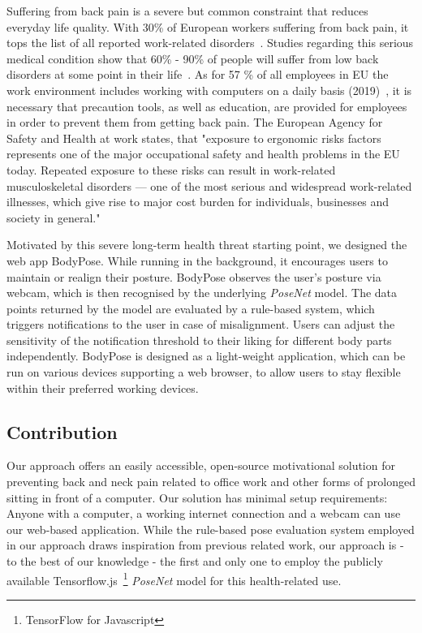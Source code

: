 Suffering from back pain is a severe but common constraint that reduces everyday life quality. With 30\% of European workers suffering from back pain, it tops the list of all reported work-related disorders~\cite{osha2000facts}. Studies regarding this serious medical condition show that 60\% - 90\% of people will suffer from low back disorders at some point in their life~\cite{osha2000facts}. As for 57 \% of all employees in EU the work environment includes working with computers on a daily basis (2019)~\cite{eurostat_comp_use}, it is necessary that precaution tools, as well as education, are provided for employees in order to prevent them from getting back pain. The European Agency for Safety and Health at work states, that "exposure to ergonomic risks factors represents one of the major occupational safety and health problems in the EU today. Repeated exposure to these risks can result in work-related musculoskeletal disorders — one of the most serious and widespread work-related illnesses, which give rise to major cost burden for individuals, businesses and society in general."~\cite{osha2019msd}

Motivated by this severe long-term health threat starting point, we designed the web app BodyPose. While running in the background, it encourages users to maintain or realign their posture. BodyPose observes the user's posture via webcam, which is then recognised by the underlying \textit{PoseNet} model. The data points returned by the model are evaluated by a rule-based system, which triggers notifications to the user in case of misalignment. Users can adjust the sensitivity of the notification threshold to their liking for different body parts independently. BodyPose is designed as a light-weight application, which can be run on various devices supporting a web browser, to allow users to stay flexible within their preferred working devices.

\subsection*{Contribution}
Our approach offers an easily accessible, open-source motivational solution for preventing back and neck pain related to office work and other forms of prolonged sitting in front of a computer. Our solution has minimal setup requirements: Anyone with a computer, a working internet connection and a webcam can use our web-based application. While the rule-based pose evaluation system employed in our approach draws inspiration from previous related work, our approach is - to the best of our knowledge - the first and only one to employ the publicly available Tensorflow.js~\footnote{TensorFlow for Javascript} \textit{PoseNet} model for this health-related use. 

